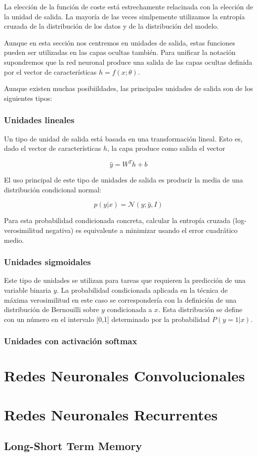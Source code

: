 	La elección de la función de coste está estrechamente relacinada con la elección de la unidad de salida. La mayoría de las veces simlpemente utilizamos la entropía cruzada de la distribución de los datos y de la distribución del modelo.
	
	Aunque en esta sección nos centremos en unidades de salida, estas funciones pueden ser	utilizadas en las capas ocultas también. Para unificar la  notación supondremos que la red neuronal produce una salida de las capas ocultas definida por el vector de características $h = f(x; \theta)$. 
	
	Aunque existen muchas posibiildades, las principales unidades de salida son de los siguientes tipos:
	
	\subsubsection{Unidades lineales}
		
		Un tipo de unidad de salida está basada en una transformación lineal. Esto es, dado el vector de características $h$, la capa produce como salida el vector 
		
		$$
			\hat{y} = W^Th + b
		$$ 
		
		El uso principal de este tipo de unidades de salida es producir la media de una distribución condicional normal:
		
		$$
			p(y | x) = \mathcal{N}(y; \hat{y}, I)
		$$ 
		
		Para esta probabilidad condicionada concreta, calcular la entropía cruzada (log-verosimilitud negativa) es equivalente a minimizar usando el error cuadrático medio.
		
	\subsubsection{Unidades sigmoidales}
	
		Este tipo de unidades se utilizan para tareas que requieren la predicción de una variable binaria $y$. La probabilidad condicionada aplicada en la técnica de máxima verosimilitud en este caso se correspondería con la definición de una distribución de Bernouilli sobre $y$ condicionada a $x$. Esta distribución se define con un número en el intervalo [0,1] determinado por la probabilidad  $P(y = 1 | x)$.
		
	\subsubsection{Unidades con activación softmax}
		
		

	
\section{Redes Neuronales Convolucionales}



\section{Redes Neuronales Recurrentes}

\subsection{Long-Short Term Memory}